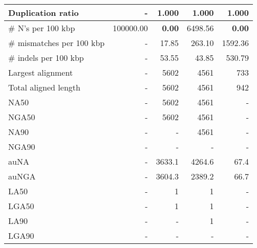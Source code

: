 \documentclass[12pt,a4paper]{article}
\begin{document}
\begin{table}[ht]
\begin{center}
\begin{tabular}{|l*{4}{|r}|}
Duplication ratio & - & 1.000 & 1.000 & 1.000 \\ \hline
\# N's per 100 kbp & 100000.00 & {\bf 0.00} & 6498.56 & {\bf 0.00} \\ \hline
\# mismatches per 100 kbp & - & 17.85 & 263.10 & 1592.36 \\ \hline
\# indels per 100 kbp & - & 53.55 & 43.85 & 530.79 \\ \hline
Largest alignment & - & 5602 & 4561 & 733 \\ \hline
Total aligned length & - & 5602 & 4561 & 942 \\ \hline
NA50 & - & 5602 & 4561 & - \\ \hline
NGA50 & - & 5602 & 4561 & - \\ \hline
NA90 & - & - & 4561 & - \\ \hline
NGA90 & - & - & - & - \\ \hline
auNA & - & 3633.1 & 4264.6 & 67.4 \\ \hline
auNGA & - & 3604.3 & 2389.2 & 66.7 \\ \hline
LA50 & - & 1 & 1 & - \\ \hline
LGA50 & - & 1 & 1 & - \\ \hline
LA90 & - & - & 1 & - \\ \hline
LGA90 & - & - & - & - \\ \hline
\end{tabular}
\end{center}
\end{table}
\end{document}
